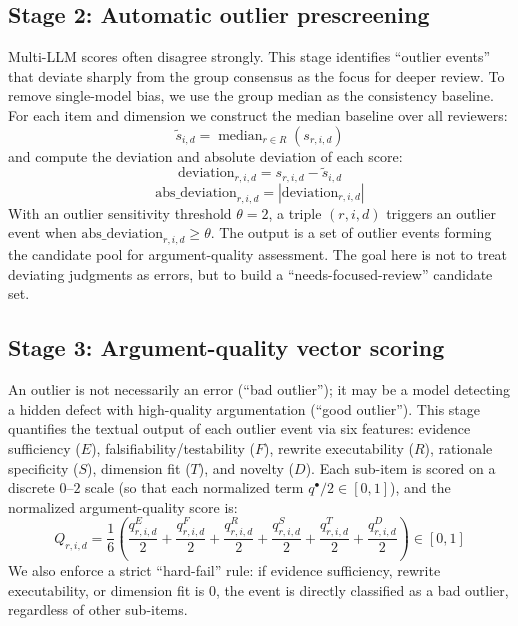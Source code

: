 \documentclass[sn-mathphys-num]{sn-jnl}
\begin{document}
\subsection{Stage 2: Automatic outlier prescreening}
Multi-LLM scores often disagree strongly. This stage identifies ``outlier events'' that deviate sharply from the group consensus as the focus for deeper review. To remove single-model bias, we use the group median as the consistency baseline. For each item and dimension we construct the median baseline over all reviewers:
\begin{equation}
\tilde{s}_{i,d} = \operatorname{median}_{r \in R}\!\left(s_{r,i,d}\right)
\label{eq:median}
\end{equation}
and compute the deviation and absolute deviation of each score:
\begin{equation}
\mathrm{deviation}_{r,i,d} = s_{r,i,d} - \tilde{s}_{i,d}
\label{eq:deviation}
\end{equation}
\begin{equation}
\mathrm{abs\_deviation}_{r,i,d} = \left| \mathrm{deviation}_{r,i,d} \right|
\label{eq:absdev}
\end{equation}
With an outlier sensitivity threshold $\theta=2$, a triple $(r,i,d)$ triggers an outlier event when $\mathrm{abs\_deviation}_{r,i,d}\ge\theta$. The output is a set of outlier events forming the candidate pool for argument-quality assessment. The goal here is not to treat deviating judgments as errors, but to build a ``needs-focused-review'' candidate set.

\subsection{Stage 3: Argument-quality vector scoring}
An outlier is not necessarily an error (``bad outlier''); it may be a model detecting a hidden defect with high-quality argumentation (``good outlier''). This stage quantifies the textual output of each outlier event via six features: evidence sufficiency ($E$), falsifiability/testability ($F$), rewrite executability ($R$), rationale specificity ($S$), dimension fit ($T$), and novelty ($D$). Each sub-item is scored on a discrete $0$--$2$ scale (so that each normalized term $q^{\bullet}/2 \in [0,1]$), and the normalized argument-quality score is:
\begin{equation}
Q_{r,i,d} = \frac{1}{6}\left(
\frac{q^{E}_{r,i,d}}{2} + \frac{q^{F}_{r,i,d}}{2} + \frac{q^{R}_{r,i,d}}{2}
+ \frac{q^{S}_{r,i,d}}{2} + \frac{q^{T}_{r,i,d}}{2} + \frac{q^{D}_{r,i,d}}{2}
\right) \in [0,1]
\label{eq:Q}
\end{equation}
We also enforce a strict ``hard-fail'' rule: if evidence sufficiency, rewrite executability, or dimension fit is $0$, the event is directly classified as a bad outlier, regardless of other sub-items.
\end{document}

